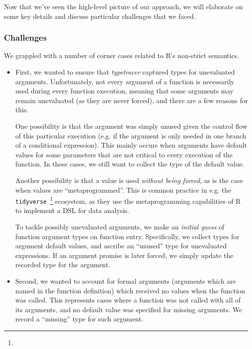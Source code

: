 \documentclass[acmsmall,review,anonymous]{acmart}\settopmatter{printfolios=true,printccs=false,printacmref=false}
\newcommand{\code}[1]{{\lstinline[style=Rin]!#1!}\xspace}
\newcommand{\typetracer}{\emph{typetracer}\xspace} %
\begin{document}
Now that we've seen the high-level picture of our approach, we will elaborate on some key details and discuss particular challenges that we faced.

%
%
\subsubsection{Challenges}
\label{subsec:typetracer-challenges}

We grappled with a number of corner cases related to R's non-strict semantics.

\begin{itemize}

\item First, we wanted to ensure that \typetracer captured types for
  unevaluated arguments.  Unfortunately, not every argument of a function is
  necessarily used during every function execution, meaning that some
  arguments may remain unevaluated (as they are never forced), and there are
  a few reasons for this.

  One possibility is that the argument was simply unused given the control
  flow of this particular execution (e.g. if the argument is only needed in
  one branch of a conditional expression).  This mainly occurs when
  arguments have default values for some parameters that are not critical to
  every execution of the function.  In these cases, we still want to collect
  the type of the default value.

Another possibility is that a value is used {\it without being forced}, as
is the case when values are ``metaprogrammed''.
This is common practice in e.g. the \code{tidyverse}~\footnote{} ecosystem, as they use the metaprogramming capabilities of R to implement a DSL for data analysis.


To tackle possibly unevaluated arguments, we make an {\it initial guess} of function argument types on
function entry. Specifically, we collect types for argument default values, and
ascribe an ``unused'' type for unevaluated expressions.  If an argument
promise is later forced, we simply update the recorded type for the
argument.

\item Second, we wanted to account for formal arguments (arguments which are
  named in the function definition) which received no values when the function was called. This represents cases where a function was not called with all of its
  arguments, and no default value was specified for missing arguments. 
  We record a ``missing'' type for such argument.


\end{itemize}
\end{document}
